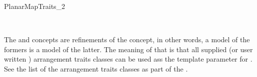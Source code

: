 \begin{ccRefConcept}{PlanarMapTraits_2}

\ccHasModels
  \\

  The  and
   concepts are refinements of the
   concept, in other words, a model of the
  formers is a model of the latter.  The meaning of that is that all
  supplied (or user written ) arrangement traits classes can be used
  ass the  template parameter for
  .  See the list of the arrangement
  traits classes as part of the .
  
\end{ccRefConcept} %

\ccRefPageEnd
















